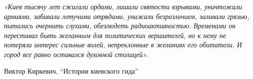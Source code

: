  
 
 
 
 

\begin{center}
\Large\em\color{blue}
«Киев тысячу лет сжигали ордами, лишали святости взрывами, уничтожали армиями,
забивали летучими отрядами, унижали безразличием, заливали грязью, пытались
очернить слухами, обезлюдеть радиоактивностью. Временами он переставал быть
желанным для политических вершителей, но к нему не потеряли интерес сильные
волей, непреклонные в желаниях его обитатели. И город все равно оставался
духовной столицей».

Виктор Киркевич, \enquote{Истории киевского гида}
\end{center}

